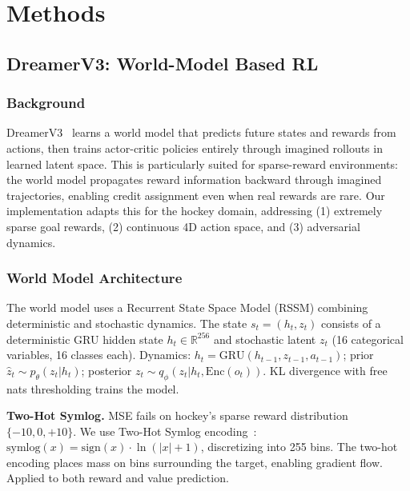 \documentclass[11pt]{article}
\begin{document}
\section{Methods}\label{sec:method}

\subsection{DreamerV3: World-Model Based RL}\label{subsec:dreamer-method}

\subsubsection{Background}

DreamerV3~\cite{hafner2024} learns a world model that predicts future states and rewards from actions, then trains actor-critic policies entirely through imagined rollouts in learned latent space. This is particularly suited for sparse-reward environments: the world model propagates reward information backward through imagined trajectories, enabling credit assignment even when real rewards are rare. Our implementation adapts this for the hockey domain, addressing (1) extremely sparse goal rewards, (2) continuous 4D action space, and (3) adversarial dynamics.

\subsubsection{World Model Architecture}

The world model uses a Recurrent State Space Model (RSSM) combining deterministic and stochastic dynamics. The state $s_t = (h_t, z_t)$ consists of a deterministic GRU hidden state $h_t \in \mathbb{R}^{256}$ and stochastic latent $z_t$ (16 categorical variables, 16 classes each). Dynamics: $h_t = \text{GRU}(h_{t-1}, z_{t-1}, a_{t-1})$; prior $\hat{z}_t \sim p_\theta(z_t | h_t)$; posterior $z_t \sim q_\phi(z_t | h_t, \text{Enc}(o_t))$. KL divergence with free nats thresholding trains the model.

\textbf{Two-Hot Symlog.} MSE fails on hockey's sparse reward distribution $\{-10, 0, +10\}$. We use Two-Hot Symlog encoding~\cite{hafner2024}: $\text{symlog}(x) = \text{sign}(x) \cdot \ln(|x| + 1)$, discretizing into 255 bins. The two-hot encoding places mass on bins surrounding the target, enabling gradient flow. Applied to both reward and value prediction.
\end{document}
